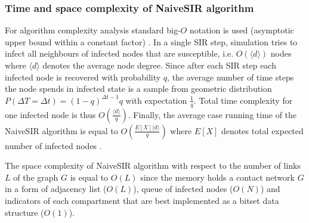 \documentclass[times, utf8, diplomski]{fer}
\begin{document}
\subsubsection{Time and space complexity of NaiveSIR algorithm}
For algorithm complexity analysis standard big-$O$ notation is used (asymptotic upper bound within a constant factor) \cite{Graham:1994:CMF:562056}. 
In a single SIR step,  simulation tries to infect all neighbours of infected nodes that are susceptible, i.e.  $O(\langle d \rangle)$ nodes where $\langle d \rangle$ denotes the average node degree. Since after each SIR step each infected node is recovered with probability $q$, the average number of time steps the node spends in infected state is a sample from geometric distribution $P(\Delta T= \Delta t) = (1 - q)^{\Delta t - 1}  q$ with expectation $\frac{1}{q}$. Total time complexity for one infected node is thus $O(\frac{\langle d \rangle}{q})$.   
Finally, the average  case running time of the NaiveSIR algorithm is equal to $O(\frac{E[X]\langle d \rangle}{q})$ where $E[X]$ denotes total expected number of infected nodes  \cite{NaiveSIR}.
 
The space complexity of NaiveSIR algorithm with respect to the number of links $L$ of the graph $G$ is equal to $O(L)$ since the memory holds a contact network $G$ in a form of adjacency list ($O(L)$), queue of infected nodes ($O(N)$) and indicators of each compartment that are best implemented as a bitset data structure ($O(1)$). 
\end{document}
